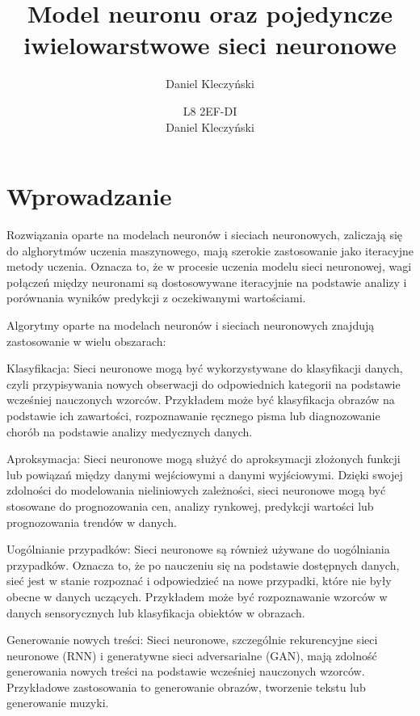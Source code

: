 \documentclass[12pt,twoside]{article}
\author{Daniel Kleczyński}
\title{Model neuronu oraz pojedyncze iwielowarstwowe sieci neuronowe }
\begin{document}
\author{L8 2EF-DI \\ Daniel Kleczyński}

\maketitle



\tableofcontents

\clearpage



\section*{Wprowadzanie}
%
Rozwiązania oparte na modelach neuronów i sieciach neuronowych, zaliczają się do alghorytmów uczenia maszynowego, mają szerokie zastosowanie jako iteracyjne
metody uczenia. Oznacza to, że w procesie uczenia modelu sieci neuronowej, wagi połączeń między neuronami są dostosowywane iteracyjnie na podstawie analizy i porównania wyników predykcji z oczekiwanymi wartościami.

Algorytmy oparte na modelach neuronów i sieciach neuronowych znajdują zastosowanie w wielu obszarach:

Klasyfikacja: Sieci neuronowe mogą być wykorzystywane do klasyfikacji danych, czyli przypisywania nowych obserwacji do odpowiednich
kategorii na podstawie wcześniej nauczonych wzorców. Przykładem może być klasyfikacja obrazów na podstawie ich zawartości, rozpoznawanie
ręcznego pisma lub diagnozowanie chorób na podstawie analizy medycznych danych.

Aproksymacja: Sieci neuronowe mogą służyć do aproksymacji złożonych funkcji lub powiązań między danymi wejściowymi a danymi
wyjściowymi. Dzięki swojej zdolności do modelowania nieliniowych zależności, sieci neuronowe mogą być stosowane do prognozowania cen, analizy
rynkowej, predykcji wartości lub prognozowania trendów w danych.

Uogólnianie przypadków: Sieci neuronowe są również używane do uogólniania przypadków. Oznacza to, że po nauczeniu się na
podstawie dostępnych danych, sieć jest w stanie rozpoznać i odpowiedzieć na nowe przypadki, które nie były obecne w danych uczących.
Przykładem może być rozpoznawanie wzorców w danych sensorycznych lub klasyfikacja obiektów w obrazach.

Generowanie nowych treści: Sieci neuronowe, szczególnie rekurencyjne sieci neuronowe (RNN) i generatywne sieci adversarialne (GAN), mają
zdolność generowania nowych treści na podstawie wcześniej nauczonych wzorców. Przykładowe zastosowania to generowanie obrazów, tworzenie
tekstu lub generowanie muzyki.
\end{document}
